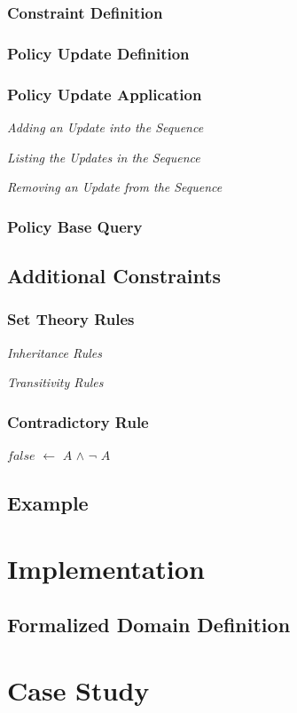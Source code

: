 \documentclass[10pt, twocolumn]{article}
\begin{document}
      \subsubsection{Constraint Definition}

      \subsubsection{Policy Update Definition}

      \subsubsection{Policy Update Application}

        \noindent \emph{Adding an Update into the Sequence}

        \noindent \emph{Listing the Updates in the Sequence}

        \noindent \emph{Removing an Update from the Sequence}

      \subsubsection{Policy Base Query}

    \subsection{Additional Constraints}

      \subsubsection{Set Theory Rules}

        \noindent \emph{Inheritance Rules}

        \noindent \emph{Transitivity Rules}

      \subsubsection{Contradictory Rule}

        $false$ $\leftarrow$ $A$ $\land$ $\lnot$ $A$

    \subsection{Example}

  \section{Implementation}

    \subsection{Formalized Domain Definition}

  \section{Case Study}
\end{document}
